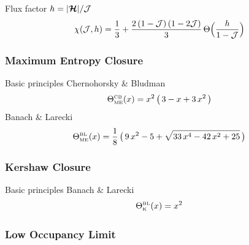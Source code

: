 Flux factor $h=|\boldsymbol{\mathcal{H}}|/\mathcal{J}$
\begin{equation}
  \chi(\mathcal{J},h)=\frac{1}{3}+\frac{2\,(1-\mathcal{J})\,(1-2\mathcal{J})}{3}\,\Theta\Big(\frac{h}{1-\mathcal{J}}\Big)
\end{equation}

\subsubsection{Maximum Entropy Closure}
Basic principles
Chernohorsky \& Bludman \cite{cernohorskyBludman_1994}
\begin{equation}
  \Theta_{\mbox{\tiny ME}}^{\mbox{\tiny CB}}(x)
  =x^{2}\,\big(\,3-x+3\,x^{2}\,\big)
\end{equation}
Banach \& Larecki
\begin{equation}
  \Theta_{\mbox{\tiny ME}}^{\mbox{\tiny BL}}(x)
  =\frac{1}{8}\,\big(\,9\,x^{2}-5+\sqrt{33\,x^{4}-42\,x^{2}+25}\,\big)
\end{equation}

\subsubsection{Kershaw Closure}
Basic principles
Banach \& Larecki \cite{banachLarecki_2017}
\begin{equation}
  \Theta_{\mbox{\tiny K}}^{\mbox{\tiny BL}}(x)=x^{2}
\end{equation}

\subsubsection{Low Occupancy Limit}